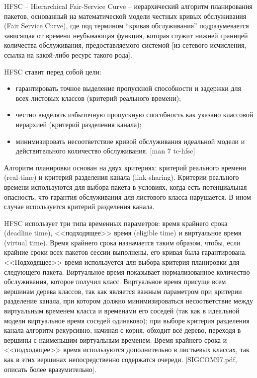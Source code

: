         HFSC -- Hierarchical Fair-Service Curve -- иерархический алгоритм планирования пакетов,
        основанный на математической модели честных кривых обслуживания (Fair Service Curve),
        где под термином “кривая обслуживания” подразумевается зависящая от времени
        неубывающая функция, которая служит нижней границей количества обслуживания,
        предоставляемого системой [из сетевого исчисления, ссылка на какой-либо ресурс
        такого рода].

    
        HFSC ставит перед собой цели:
        \begin{itemize}
            \item гарантировать точное выделение пропускной способности и задержки для всех листовых классов (критерий реального времени);
            \item честно выделять избыточную пропускную способность как указано классовой иерархией (критерий разделения канала);
            \item минимизировать несоответствие кривой обслуживания идеальной модели и действительного количество обслуживания. [man 7 tc-hfsc]
        \end{itemize}

        Алгоритм планировки основан на двух критериях: критерий реального времени
        (real-time) и критерий разделения канала (link-sharing). Критерии реального времени
        используются для выбора пакета в условиях, когда есть потенциальная опасность,
        что гарантия обслуживания для листового класса нарушается. В ином случае
        используется критерий разделения канала.

        HFSC использует три типа временных параметров: время крайнего срока (deadline
        time), <<подходящее>> время (eligible time) и виртуальное время (virtual time). Время крайнего
        срока назначается таким образом, чтобы, если крайние сроки всех пакетов сессии
        выполнены, его кривая была гарантирована. <<Подходящее>> время используется для
        выбора критерия планировки для следующего пакета. Виртуальное время показывает
        нормализованное количество обслуживания, которое получил класс. Виртуальное
        время присуще всем вершинам дерева классов, так как является важным параметром
        при критерии разделение канала, при котором должно минимизироваться
        несоответствие между виртуальным временем класса и временами его соседей
        (так как в идеальной модели виртуальное время соседей одинаково); при выборе
        критерия разделения канала алгоритм рекурсивно, начиная с корня, обходит всё
        дерево, переходя в вершины с наименьшим виртуальным временем. Время крайнего
        срока и <<подходящее>> время используются дополнительно в листьевых классах,
        так как в этих вершинах непосредственно содержатся очереди. [SIGCOM97.pdf, описать
        более вразумительно].

